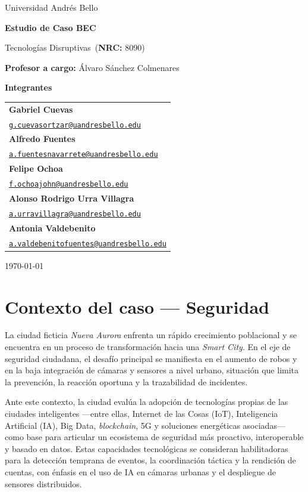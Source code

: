 \documentclass[12pt,a4paper]{article}
\makeatletter
\newcommand{\Universidad}{Universidad Andrés Bello}
\newcommand{\Materia}{Tecnologías Disruptivas}
\newcommand{\NRC}{8090}
\newcommand{\Profesor}{Álvaro Sánchez Colmenares}
\newcommand{\NombreCaso}{Estudio de Caso BEC}
\newcommand{\Integrantes}{%
  \begin{tabular}{@{}l}
    \textbf{Gabriel Cuevas}\\[-2pt]
    \texttt{\href{mailto:g.cuevasortzar@uandresbello.edu}{g.cuevasortzar@uandresbello.edu}}\\[6pt]
    \textbf{Alfredo Fuentes}\\[-2pt]
    \texttt{\href{mailto:a.fuentesnavarrete@uandresbello.edu}{a.fuentesnavarrete@uandresbello.edu}}\\[6pt]
    \textbf{Felipe Ochoa}\\[-2pt]
    \texttt{\href{mailto:f.ochoajohn@uandresbello.edu}{f.ochoajohn@uandresbello.edu}}\\[6pt]
    \textbf{Alonso Rodrigo Urra Villagra}\\[-2pt]
    \texttt{\href{mailto:a.urravillagra@uandresbello.edu}{a.urravillagra@uandresbello.edu}}\\[6pt]
    \textbf{Antonia Valdebenito}\\[-2pt]
    \texttt{\href{mailto:a.valdebenitofuentes@uandresbello.edu}{a.valdebenitofuentes@uandresbello.edu}}
  \end{tabular}
}
\newcommand{\Fecha}{\today}
\makeatother
\begin{document}
\begin{titlepage}
  \centering
  \vspace*{1cm}
  {\Large \Universidad\par}
  \vspace{3cm}
  {\LARGE\bfseries \NombreCaso\par}
  \vspace{1.5cm}
  {\large \Materia\ (\textbf{NRC:} \NRC)\par}
  \vspace{0.4cm}
  {\large \textbf{Profesor a cargo:} \Profesor\par}
  \vspace{2.2cm}
  {\large \textbf{Integrantes}\par}
  \vspace{0.3cm}
  {\large \Integrantes\par}
  \vfill
  {\large \Fecha\par}
\end{titlepage}

\clearpage
{}  %
\justifying             %

\section*{Contexto del caso — Seguridad}

La ciudad ficticia \textit{Nueva Aurora} enfrenta un rápido crecimiento poblacional y se encuentra en un proceso de transformación hacia una \textit{Smart City}. En el eje de seguridad ciudadana, el desafío principal se manifiesta en el aumento de robos y en la baja integración de cámaras y sensores a nivel urbano, situación que limita la prevención, la reacción oportuna y la trazabilidad de incidentes.

Ante este contexto, la ciudad evalúa la adopción de tecnologías propias de las ciudades inteligentes —entre ellas, Internet de las Cosas (IoT), Inteligencia Artificial (IA), Big Data, \textit{blockchain}, 5G y soluciones energéticas asociadas— como base para articular un ecosistema de seguridad más proactivo, interoperable y basado en datos. Estas capacidades tecnológicas se consideran habilitadoras para la detección temprana de eventos, la coordinación táctica y la rendición de cuentas, con énfasis en el uso de IA en cámaras urbanas y el despliegue de sensores distribuidos.
\end{document}
